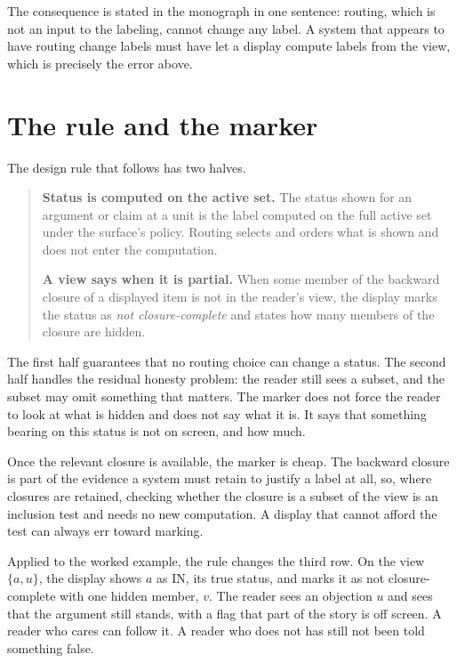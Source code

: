 \documentclass[11pt]{article}
\newcommand{\IN}{\textsf{IN}}
\begin{document}
The consequence is stated in the monograph in one sentence: routing, which is not an input to the labeling, cannot change any label. A system that appears to have routing change labels must have let a display compute labels from the view, which is precisely the error above.

\section{The rule and the marker}\label{sec:rule}

The design rule that follows has two halves.

\begin{quote}
\textbf{Status is computed on the active set.} The status shown for an argument or claim at a unit is the label computed on the full active set under the surface's policy. Routing selects and orders what is shown and does not enter the computation.

\textbf{A view says when it is partial.} When some member of the backward closure of a displayed item is not in the reader's view, the display marks the status as \emph{not closure-complete} and states how many members of the closure are hidden.
\end{quote}

The first half guarantees that no routing choice can change a status. The second half handles the residual honesty problem: the reader still sees a subset, and the subset may omit something that matters. The marker does not force the reader to look at what is hidden and does not say what it is. It says that something bearing on this status is not on screen, and how much.

Once the relevant closure is available, the marker is cheap. The backward closure is part of the evidence a system must retain to justify a label at all, so, where closures are retained, checking whether the closure is a subset of the view is an inclusion test and needs no new computation. A display that cannot afford the test can always err toward marking.

Applied to the worked example, the rule changes the third row. On the view $\{a,u\}$, the display shows $a$ as \IN, its true status, and marks it as not closure-complete with one hidden member, $v$. The reader sees an objection $u$ and sees that the argument still stands, with a flag that part of the story is off screen. A reader who cares can follow it. A reader who does not has still not been told something false.
\end{document}
